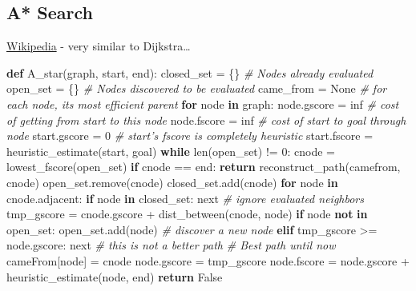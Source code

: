 \documentclass[11pt]{article}
\newenvironment{Shaded}{}{}
\newcommand{\KeywordTok}[1]{\textcolor[rgb]{0.00,0.44,0.13}{\textbf{{#1}}}}
\newcommand{\DecValTok}[1]{\textcolor[rgb]{0.25,0.63,0.44}{{#1}}}
\newcommand{\CommentTok}[1]{\textcolor[rgb]{0.38,0.63,0.69}{\textit{{#1}}}}
\newcommand{\NormalTok}[1]{{#1}}
\newcommand{\VariableTok}[1]{\textcolor[rgb]{0.10,0.09,0.49}{{#1}}}
\newcommand{\ControlFlowTok}[1]{\textcolor[rgb]{0.00,0.44,0.13}{\textbf{{#1}}}}
\newcommand{\OperatorTok}[1]{\textcolor[rgb]{0.40,0.40,0.40}{{#1}}}
\newcommand{\BuiltInTok}[1]{{#1}}
\begin{document}
    \subsection{A* Search}\label{a-search}

\href{https://en.wikipedia.org/wiki/A*_search_algorithm}{Wikipedia} -
very similar to Dijkstra\ldots{}

\begin{Shaded}
\begin{Highlighting}[]
\KeywordTok{def} \NormalTok{A_star(graph, start, end):}
  \NormalTok{closed_set }\OperatorTok{=} \NormalTok{\{\}  }\CommentTok{# Nodes already evaluated}
  \NormalTok{open_set }\OperatorTok{=} \NormalTok{\{\}  }\CommentTok{# Nodes discovered to be evaluated}
  \NormalTok{came_from }\OperatorTok{=} \VariableTok{None}  \CommentTok{# for each node, its most efficient parent}
  \ControlFlowTok{for} \NormalTok{node }\KeywordTok{in} \NormalTok{graph:}
    \NormalTok{node.gscore }\OperatorTok{=} \NormalTok{inf  }\CommentTok{# cost of getting from start to this node}
    \NormalTok{node.fscore }\OperatorTok{=} \NormalTok{inf  }\CommentTok{# cost of start to goal through node}
  \NormalTok{start.gscore }\OperatorTok{=} \DecValTok{0}
  \CommentTok{# start's fscore is completely heuristic}
  \NormalTok{start.fscore }\OperatorTok{=} \NormalTok{heuristic_estimate(start, goal)}
  \ControlFlowTok{while} \BuiltInTok{len}\NormalTok{(open_set) }\OperatorTok{!=} \DecValTok{0}\NormalTok{:}
    \NormalTok{cnode }\OperatorTok{=} \NormalTok{lowest_fscore(open_set)}
    \ControlFlowTok{if} \NormalTok{cnode }\OperatorTok{==} \NormalTok{end:}
      \ControlFlowTok{return} \NormalTok{reconstruct_path(camefrom, cnode)}
    \NormalTok{open_set.remove(cnode)}
    \NormalTok{closed_set.add(cnode)}
    \ControlFlowTok{for} \NormalTok{node }\KeywordTok{in} \NormalTok{cnode.adjacent:}
      \ControlFlowTok{if} \NormalTok{node }\KeywordTok{in} \NormalTok{closed_set:}
        \BuiltInTok{next} \CommentTok{# ignore evaluated neighbors}
      \NormalTok{tmp_gscore }\OperatorTok{=} \NormalTok{cnode.gscore }\OperatorTok{+} \NormalTok{dist_between(cnode, node)}
      \ControlFlowTok{if} \NormalTok{node }\KeywordTok{not} \KeywordTok{in} \NormalTok{open_set:}
        \NormalTok{open_set.add(node) }\CommentTok{# discover a new node}
      \ControlFlowTok{elif} \NormalTok{tmp_gscore }\OperatorTok{>=} \NormalTok{node.gscore:}
        \BuiltInTok{next} \CommentTok{# this is not a better path}
      \CommentTok{# Best path until now}
      \NormalTok{cameFrom[node] }\OperatorTok{=} \NormalTok{cnode}
      \NormalTok{node.gscore }\OperatorTok{=} \NormalTok{tmp_gscore}
      \NormalTok{node.fscore }\OperatorTok{=} \NormalTok{node.gscore }\OperatorTok{+} \NormalTok{heuristic_estimate(node, end)}
  \ControlFlowTok{return} \VariableTok{False}
  

\end{Highlighting}
\end{Shaded}
\end{document}
